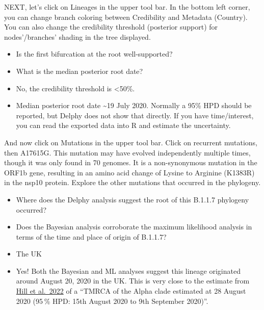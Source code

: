 \documentclass[
]{book}
\begin{document}
NEXT, let's click on Lineages in the upper tool bar. In the bottom left corner, you can change branch coloring between Credibility and Metadata (Country). You can also change the credibility threshold (posterior support) for nodes'/branches' shading in the tree displayed.

\begin{itemize}
\item
  Is the first bifurcation at the root well-supported?
\item
  What is the median posterior root date?
\end{itemize}

\begin{itemize}
\item
  No, the credibility threshold is \textless50\%.
\item
  Median posterior root date \textasciitilde19 July 2020. Normally a 95\% HPD should be reported, but Delphy does not show that directly. If you have time/interest, you can read the exported data into R and estimate the uncertainty.
\end{itemize}

And now click on Mutations in the upper tool bar. Click on recurrent mutations, then A17615G. This mutation may have evolved independently multiple times, though it was only found in 70 genomes. It is a non-synonymous mutation in the ORF1b gene, resulting in an amino acid change of Lysine to Arginine (K1383R) in the nsp10 protein. Explore the other mutations that occurred in the phylogeny.

\begin{itemize}
\item
  Where does the Delphy analysis suggest the root of this B.1.1.7 phylogeny occurred?
\item
  Does the Bayesian analysis corroborate the maximum likelihood analysis in terms of the time and place of origin of B.1.1.7?
\end{itemize}

\begin{itemize}
\item
  The UK
\item
  Yes! Both the Bayesian and ML analyses suggest this lineage originated around August 20, 2020 in the UK. This is very close to the estimate from \href{https://academic.oup.com/ve/article/8/2/veac080/6677185}{Hill et al.~2022} of a ``TMRCA of the Alpha clade estimated at 28 August 2020 (95 \% HPD: 15th August 2020 to 9th September 2020)''.
\end{itemize}
\end{document}

